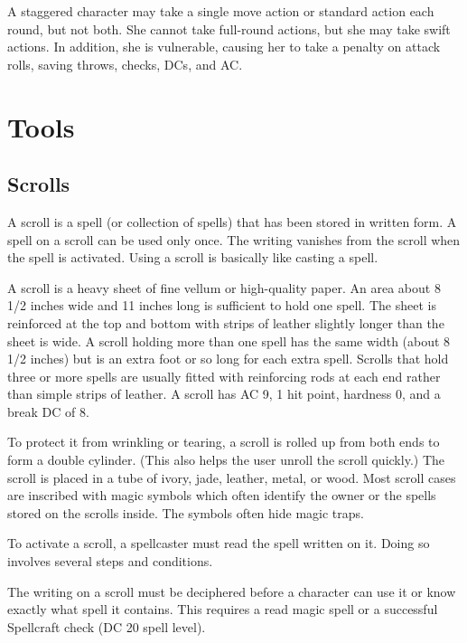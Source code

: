 A staggered character may take a single move action or standard action each round, but not both. She cannot take full-round actions, but she may take swift actions. In addition, she is vulnerable, causing her to take a  penalty on attack rolls, saving throws, checks, DCs, and AC.


\section{Tools}

\subsection{Scrolls}
A scroll is a spell (or collection of spells) that has been stored in written form. A spell on a scroll can be used only once. The writing vanishes from the scroll when the spell is activated. Using a scroll is basically like casting a spell.

 A scroll is a heavy sheet of fine vellum or high-quality paper. An area about 8 1/2 inches wide and 11 inches long is sufficient to hold one spell. The sheet is reinforced at the top and bottom with strips of leather slightly longer than the sheet is wide. A scroll holding more than one spell has the same width (about 8 1/2 inches) but is an extra foot or so long for each extra spell. Scrolls that hold three or more spells are usually fitted with reinforcing rods at each end rather than simple strips of leather. A scroll has AC 9, 1 hit point, hardness 0, and a break DC of 8.

To protect it from wrinkling or tearing, a scroll is rolled up from both ends to form a double cylinder. (This also helps the user unroll the scroll quickly.) The scroll is placed in a tube of ivory, jade, leather, metal, or wood. Most scroll cases are inscribed with magic symbols which often identify the owner or the spells stored on the scrolls inside. The symbols often hide magic traps.

 To activate a scroll, a spellcaster must read the spell written on it. Doing so involves several steps and conditions.

 The writing on a scroll must be deciphered before a character can use it or know exactly what spell it contains. This requires a read magic spell or a successful Spellcraft check (DC 20 \add spell level).

